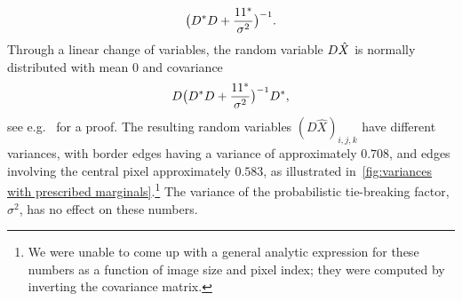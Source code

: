 \begin{equation}
	\bigl( D^{\ast}D + \frac{\num{1}\num{1}^{\ast}}{\sigma^{\num{2}}} \bigr)^{-1}.
\end{equation}
Through a linear change of variables, the random variable \( D\hat{X} \) is normally distributed with mean \num{0} and covariance
\begin{equation}
	D\bigl( D^{\ast}D + \frac{\num{1}\num{1}^{\ast}}{\sigma^{\num{2}}} \bigr)^{\num{-1}}D^{\ast},
\end{equation}
see e.g.\ \cite[theorem 3.1]{Gut2009} for a proof.
The resulting random variables \( (D\hat{X})_{i, j, k} \) have different variances, with border edges having a variance of approximately \( \num{0.708} \), and edges involving the central pixel approximately \( \num{0.583} \), as illustrated in~\cref{fig:variances with prescribed marginals}.\footnote{%
	We were unable to come up with a general analytic expression for these numbers as a function of image size and pixel index;
	they were computed by inverting the covariance matrix.
}
The variance of the probabilistic tie-breaking factor, \( \sigma^{\num{2}} \), has no effect on these numbers.

